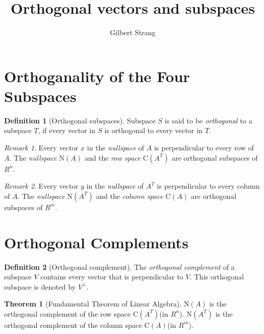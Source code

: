 \documentclass{tufte-handout}
\author{Gilbert Strang}
\title{Orthogonal vectors and subspaces}
\theoremstyle{definition} \newtheorem{definition}{Definition}
\newtheorem{theorem}{Theorem}
\theoremstyle{remark} \newtheorem{remark}{Remark}
\begin{document}
\maketitle

\section{Orthoganality of the Four Subspaces}
\begin{definition}[Orthogonal subspaces]
  Subspace $S$ is said to be \emph{orthogonal} to a subspace $T$, if
  every vector in $S$ is orthogonal to every vector in $T$.
\end{definition}

\begin{remark}
  Every vector $x$ in the \emph{nullspace} of $A$ is perpendicular to
  every row of $A$. The \emph{nullspace} $\mathrm{N}(A)$ and the
  \emph{row space} $\mathrm{C}(A^T)$ are orthogonal subspaces of $R^n$.
\end{remark}

\begin{remark}
  Every vector $y$ in the \emph{nullspace} of $A^T$ is perpendicular to
  every column of $A$. The \emph{nullspace} $\mathrm{N}(A^T)$ and the
  \emph{column space} $\mathrm{C}(A)$ are orthogonal subspaces of $R^m$.
\end{remark}

\section{Orthogonal Complements}
\begin{definition}[Orthogonal complement]
  The \emph{orthogonal complement} of a subspace $V$ contains every vector
  that is perpendicular to $V$. This orthogonal subspace is denoted by
  $V^{\perp}$.
\end{definition}


\begin{theorem}[Fundamental Theorem of Linear Algebra]
  $\mathrm{N}(A)$ is the orthogonal complement of the row space
  $\mathrm{C}(A^T)$(in $R^n$). $\mathrm{N}(A^T)$ is the orthogonal
  complement of the column space $\mathrm{C}(A)$(in $R^m$).
\end{theorem}
\end{document}
